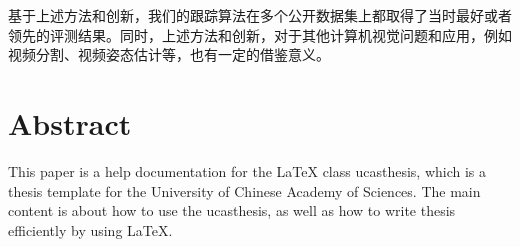 基于上述方法和创新，我们的跟踪算法在多个公开数据集上都取得了当时最好或者领先的评测结果。同时，上述方法和创新，对于其他计算机视觉问题和应用，例如视频分割、视频姿态估计等，也有一定的借鉴意义。

\intobmk\chapter*{Abstract}%

This paper is a help documentation for the \LaTeX{} class ucasthesis, which is  a thesis template for the University of Chinese Academy of Sciences. The main content is about how to use the ucasthesis, as well as how to write thesis efficiently by using \LaTeX{}.

